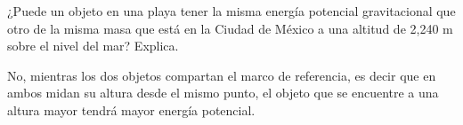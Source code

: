 ¿Puede un objeto en una playa tener la misma energía potencial gravitacional
que otro de la misma masa que está en la Ciudad de México a una altitud de 2,240 m sobre el nivel del mar? Explica.


\begin{solutionbox}{1.6cm}
    No, mientras los dos objetos compartan el marco de referencia, es decir que en
    ambos midan su altura desde el mismo punto, el objeto que se encuentre a una
    altura mayor tendrá mayor energía potencial.
\end{solutionbox}
